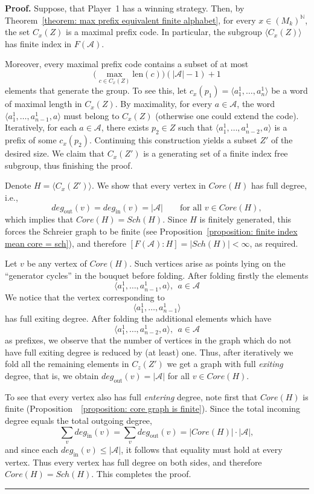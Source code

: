\documentclass[a4,12pt]{article}%
\newenvironment{proof}[1][Proof]{\textbf{#1.} }{\ \rule{0.5em}{0.5em}}
\begin{document}
\begin{proof}
Suppose, that Player~1 has a winning strategy.
Then, by Theorem~\ref{theorem: max prefix equivalent finite alphabet}, for every
$x \in (M_k)^{\mathbb{N}}$, the set $C_x(Z)$ is a maximal prefix code. In
particular, the subgroup $\langle C_x(Z) \rangle$ has finite index in
$F(\mathcal{A})$.

Moreover, every maximal prefix code contains a subset of at most 
\[
\big(\max_{c \in C_x(Z)} \mathrm{len}(c)\big)(|\mathcal{A}|-1) + 1
\]
elements that generate the group. To see this, let $c_x(p_1) = \langle a^1_1,\dots,a^1_n \rangle$
be a word of maximal length in $C_x(Z)$. By maximality, for every $a \in \mathcal{A}$,
the word $\langle a^1_1, \dots, a^1_{n-1}, a \rangle$ must belong to $C_x(Z)$
(otherwise one could extend the code). Iteratively, for each $a \in \mathcal{A}$,
there exists $p_2 \in Z$ such that $\langle a^1_1, \dots, a^1_{n-2}, a \rangle$
is a prefix of some $c_x(p_2)$. Continuing this construction yields a
subset $Z'$ of the desired size. We claim that $C_x(Z')$ is a generating set of a finite index free subgroup, thus finishing the proof.

\medskip

Denote $H=\langle C_x(Z') \rangle$.
We show that every vertex in $Core(H)$ has full degree, i.e.,  
\[
deg_{\mathrm{out}}(v) = deg_{\mathrm{in}}(v) = |\mathcal{A}|
\qquad \text{for all } v \in Core(H),
\]
which implies that $Core(H)=Sch(H)$. Since $H$ is finitely generated, this forces the Schreier graph to be finite (see Proposition~\ref{proposition: finite index mean core = sch}), and therefore $[F(\mathcal{A}) : H] = |Sch(H)| < \infty$, as required.

\medskip 

Let $v $ be any vertex of $Core(H)$. Such vertices arise as points lying on the
“generator cycles” in the bouquet before folding. After folding firstly the elements 
\[
\langle a^1_1, \dots, a^1_{n-1}, a \rangle , \ \ a \in \mathcal{A}
\]
We notice that the vertex corresponding to \[
\langle a^1_1, \dots, a^1_{n-1} \rangle
\] 
has full exiting degree. After folding the additional elements which have 
\[
\langle a^1_1, \dots, a^1_{n-2}, a \rangle , \ \ a \in \mathcal{A}
\]
as prefixes, we observe that the number of vertices in the graph which do not have full exiting degree is reduced by (at least) one. Thus, after iteratively we fold all the remaining elements in $C_z(Z')$ we get a graph with full \emph{exiting} degree, that is, we obtain $deg_{\mathrm{out}}(v) = |\mathcal{A}|$ for all $v\in Core(H)$.

\smallskip

To see that every vertex also has full \emph{entering} degree, note first that $Core(H)$ is finite (Proposition~~\ref{proposition: core graph is finite}).  
Since the total incoming degree equals the total outgoing degree,
\[
\sum_{v} deg_{\mathrm{in}}(v)
  = \sum_{v} deg_{\mathrm{out}}(v)
  = |Core(H)| \cdot |\mathcal{A}|,
\]
and since each $deg_{\mathrm{in}}(v) \le |\mathcal{A}|$, it follows that equality must hold at every vertex.  
Thus every vertex has full degree on both sides, and therefore $Core(H) = Sch(H)$.  
This completes the proof.
\end{proof}
\end{document}
